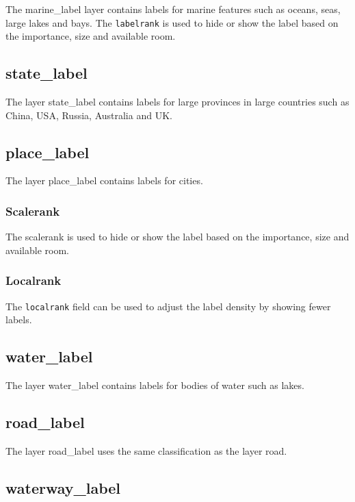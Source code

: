 The marine\_label layer contains labels for marine features such as
oceans, seas, large lakes and bays.
The \texttt{labelrank} is used to hide or show the label based on the importance,
size and available room.

\subsection*{state\_label}\label{state_label}

The layer state\_label contains labels for large provinces in large
countries such as China, USA, Russia, Australia and UK.

\subsection*{place\_label}\label{place_label}

The layer place\_label contains labels for cities.

\subsubsection*{Scalerank}

The scalerank is used to hide or show the label based on the importance,
size and available room.

\subsubsection*{Localrank}

The \texttt{localrank} field can be used to adjust the label density by showing
fewer labels.

\subsection*{water\_label}

The layer water\_label contains labels for bodies of water such as
lakes.

\subsection*{road\_label}

The layer road\_label uses the same classification as the layer road.

\subsection*{waterway\_label}

